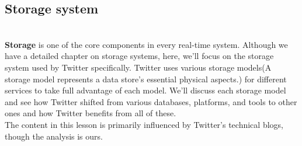 

\subsection{Storage system}\label{BOYQ86EbkY9OiCKgaPhER}
\\
\textbf{Storage} is one of the core components in every real-time system. Although we have a detailed chapter on storage systems, here, we'll focus on the storage system used by Twitter specifically. Twitter uses various storage models(A storage model represents a data store's essential physical aspects.) for different services to take full advantage of each model. We'll discuss each storage model and see how Twitter shifted from various databases, platforms, and tools to other ones and how Twitter benefits from all of these.
\\
The content in this lesson is primarily influenced by Twitter's technical blogs, though the analysis is ours.


